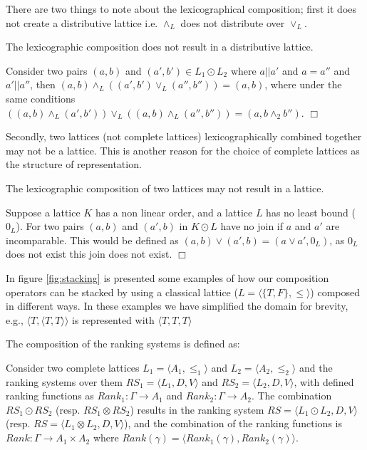 There are two things to note about the lexicographical composition; 
first it does not create a distributive lattice i.e. $\wedge_L$ does not distribute over $\vee_L$.
\begin{prop}
The lexicographic composition does not result in a distributive lattice.
\end{prop}
\begin{prof}
Consider two pairs $(a,b)$ and $(a', b') \in L_1 \odot L_2$ where $a || a'$ and $a = a''$ and $a' || a''$,
then $(a,b) \wedge_{L} ((a', b') \vee_{L} (a'', b'')) = (a,b)$,
where under the same conditions $((a,b) \wedge_{L} (a', b')) \vee_{L} ((a,b) \wedge_{L} (a'', b'')) = (a,b \wedge_2 b'')$.
$\Box$\end{prof}

Secondly, two lattices (not complete lattices) lexicographically combined together may not be a lattice. 
This is another reason for the choice of complete lattices as the structure of representation.
\begin{prop}
The lexicographic composition of two lattices may not result in a lattice.
\end{prop}
\begin{prof}
Suppose a lattice $K$ has a non linear order, and a lattice $L$ has no least bound ($0_L$). 
For two pairs $(a,b)$ and $(a',b)$ in $K \odot L$ have no join if $a$ and $a'$ are incomparable.
This would be defined as $(a,b) \vee (a',b) = (a \vee a',0_L)$, as $0_L$ does not exist this join does not exist.
$\Box$\end{prof}

In figure \ref{fig:stacking} is presented some examples of how our composition operators can be stacked
by using a classical lattice ($L = \langle \{T,F\}, \leq \rangle$) composed in different ways.
In these examples we have simplified the domain for brevity, 
e.g., $\langle T, \langle T,T\rangle\rangle$ is represented with $\langle T,T,T\rangle$

The composition of the ranking systems is defined as:
\begin{defs}
Consider two complete lattices $L_1 = \langle A_1, \leq_1 \rangle$ and $L_2 = \langle A_2,\leq_2 \rangle$ and
the ranking systems over them $RS_1 = \langle L_1,D,V \rangle $ and $RS_2 = \langle L_2,D,V \rangle$,
with defined ranking functions as $Rank_1: \Gamma \rightarrow A_1 $ and $Rank_2: \Gamma \rightarrow A_2$.
The combination $RS_1 \odot RS_2$ (resp. $RS_1 \otimes RS_2$) results in the ranking system 
$RS = \langle L_1 \odot L_2, D, V \rangle$ (resp. $RS = \langle L_1 \otimes L_2, D, V \rangle$), 
and the combination of the ranking functions is 
$Rank: \Gamma \rightarrow A_1 \times A_2$ where $Rank(\gamma) = \langle Rank_1(\gamma), Rank_2(\gamma) \rangle$.
\end{defs}

